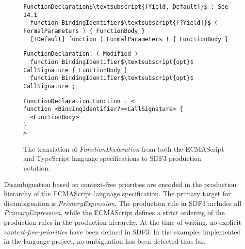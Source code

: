 \begin{figure*}
  \begin{lstlisting}[caption=Definition of \textit{FunctionDeclaration} in the ECMAScript language specification,mathescape]
FunctionDeclaration$\textsubscript{[Yield, Default]}$ : See 14.1
  function BindingIdentifier$\textsubscript{[?Yield]}$ ( FormalParameters ) { FunctionBody }
  [+Default] function ( FormalParameters ) { FunctionBody }
  \end{lstlisting}
  \begin{lstlisting}[caption=Definition of \textit{FunctionDeclaration} in the TypeScript language specification,mathescape]
FunctionDeclaration: ( Modified )
  function BindingIdentifier$\textsubscript{opt}$ CallSignature { FunctionBody }
  function BindingIdentifier$\textsubscript{opt}$ CallSignature ;
  \end{lstlisting}
  \begin{lstlisting}[caption=Definition of \textit{FunctionDeclaration} in SDF3 production notation]
FunctionDeclaration.Function = <
function <BindingIdentifier?><CallSignature> {
  <FunctionBody>
}
>
  \end{lstlisting}
  \caption{The translation of \textit{FunctionDeclaration} from both the ECMAScript and TypeScript language specifications to SDF3 production notation.}
  \label{fig:override-syntax}
\end{figure*}

Disambiguation based on context-free priorities are encoded in the production hierarchy of the ECMAScript language specification.
The primary target for disambiguation is \textit{PrimaryExpression}.
The production rule in SDF3 includes all \textit{PrimaryExpression}, while the ECMAScript defines a strict ordering of the production rules in the production hierarchy.
At the time of writing, no explicit \textit{context-free-priorities} have been defined in SDF3.
In the examples implemented in the language project, no ambiguation has been detected thus far.

